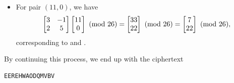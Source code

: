 \documentclass[letterpaper]{article}
\newcommand{\0}{\mathbf{0}}
\begin{document}
\begin{mdframed}
\begin{mdframed}
\begin{itemize}
            \item For pair $(11, 0)$, we have 
            \[\begin{bmatrix}
                3 & -1 \\ 2 & 5
            \end{bmatrix} \begin{bmatrix}
                11 \\ 0
            \end{bmatrix} \ (\mathrm{mod}\ 26) = \begin{bmatrix}
                33 \\ 22
            \end{bmatrix} \ (\mathrm{mod}\ 26) = \begin{bmatrix}
                7 \\ 22
            \end{bmatrix} \ (\mathrm{mod}\ 26),\]
            corresponding to  and .
        \end{itemize}
        By continuing this process, we end up with the ciphertext 
        \begin{mdframed}
\begin{verbatim}
EEREHWAODQMVBV\end{verbatim}
        \end{mdframed}
    \end{mdframed}
\end{mdframed}
\end{document}
